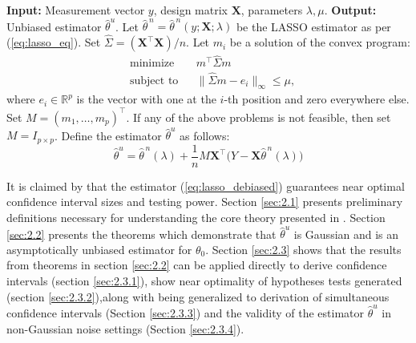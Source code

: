 \documentclass{article}
\begin{document}
\begin{algorithm}
\caption{Unbiased estimator for $\theta_0$ in high-dimensional linear regression models}
\begin{algorithmic}[1]
\Statex\textbf{Input:} Measurement vector $y$, design matrix $\mathbf{X}$, parameters $\lambda,\mu$.
\Statex\textbf{Output:} Unbiased estimator $\hat{\theta}^{u}$.
\State Let $\hat{\theta}^{\,n}=\hat{\theta}^{\,n}(y;\mathbf{X};\lambda)$ be the LASSO estimator as per (\ref{eq:lasso_eq}).
\State Set $\widehat{\Sigma}=(\mathbf{X}^{\top}\mathbf{X})/n$.
    \State Let $m_i$ be a solution of the convex program:
    \begin{equation}
    \begin{aligned}
    &\text{minimize} && m^\top \widehat{\Sigma} m \\
    &\text{subject to} && \|\widehat{\Sigma}m-e_i\|_\infty \le \mu,
    \end{aligned}
    \label{eq:convex_optimization}
    \end{equation}
    where $e_i\in\mathbb{R}^p$ is the vector with one at the $i$-th position and zero everywhere else.
\EndFor
\State Set $M=(m_1,\dots,m_p)^\top$. If any of the above problems is not feasible, then set $M=I_{p\times p}$.
\State Define the estimator $\hat{\theta}^{u}$ as follows:
\begin{equation}
    \hat{\theta}^{u}
=
\hat{\theta}^{\,n}(\lambda)
+\frac{1}{n}M\mathbf{X}^{\top}\bigl(Y-\mathbf{X}\hat{\theta}^{\,n}(\lambda)\bigr)
\label{eq:lasso_debiased}
\end{equation}
\end{algorithmic}
\end{algorithm}

It is claimed by \citet{javanmard14a} that the estimator (\ref{eq:lasso_debiased}) guarantees near optimal confidence interval sizes and testing power. Section \ref{sec:2.1} presents preliminary definitions necessary for understanding the core theory presented in \citet{javanmard14a}. Section \ref{sec:2.2} presents the theorems which demonstrate that $\hat{\theta}^{u}$ is Gaussian and is an asymptotically unbiased estimator for $\theta_0$. Section \ref{sec:2.3} shows that the results from theorems in section \ref{sec:2.2} can be applied directly to derive confidence intervals (section \ref{sec:2.3.1}), show near optimality of hypotheses tests generated (section \ref{sec:2.3.2}),along with being generalized to derivation of simultaneous confidence intervals (Section \ref{sec:2.3.3}) and the validity of the estimator $\hat{\theta}^u$ in non-Gaussian noise settings (Section \ref{sec:2.3.4}).
\end{document}
